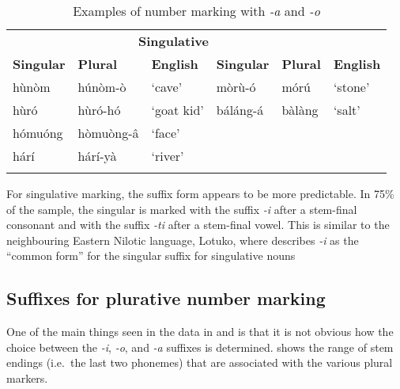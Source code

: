 \documentclass[output=paper]{langsci/langscibook}
\begin{document}
\begin{table}
\begin{tabularx}{\textwidth}{XlXXXX}
\lsptoprule

\multicolumn{3}{c}{ \textbf{Plural}} & \multicolumn{3}{c}{ \textbf{Singulative}}\\ \cmidrule(lr){1-3}\cmidrule(lr){4-6}
 \textbf{Singular} & \textbf{Plural} & \textbf{English} & \textbf{Singular} & \textbf{Plural} & \textbf{English}\\ \midrule
 h\`{u}n\`{o}m &  h\'{u}n\`{o}m-\`{o} & ‘cave’ &  m\`{o}r\`{u}-\'{o} &  m\'{o}r\'{u} & ‘stone’\\
 h\`{u}r\'{o} &  h\`{u}r\'{o}-h\'{o} & ‘goat kid’ &  b\'{a}l\'{a}ng-\'{a} &  b\`{a}l\`{a}ng & ‘salt’\\
 h\'{o}mu\'{o}ng &  h\`{o}mu\`{o}ng-\^{a} & ‘face’ &  &  & \\
 h\'{a}r\'{i} &  h\'{a}r\'{i}-y\`{a} & ‘river’ &  &  & \\
\lspbottomrule
\end{tabularx}
\caption{Examples of number marking with \textit{-a} and \textit{-o}} 
\label{tab:moodie:11}
\end{table}

For singulative marking, the suffix form appears to be more predictable.  In 75\% of the sample, the singular is marked with the suffix \textit{-i} after a stem-final consonant and with the suffix \textit{-ti} after a stem-final vowel. This is similar to the neighbouring Eastern Nilotic language, Lotuko, where \citet[7]{Arber1936} describes \textit{-i} as the “common form” for the singular suffix for singulative nouns 

\subsection{Suffixes for plurative number marking}\label{sec:moodie:4.2} 

One of the main things seen in the data in  and  is that it is not obvious how the choice between the \textit{{}-i}, \textit{-o}, and \textit{{}-a} suffixes is determined.  shows the range of stem endings (i.e.\ the last two phonemes) that are associated with the various plural markers.
\end{document}
